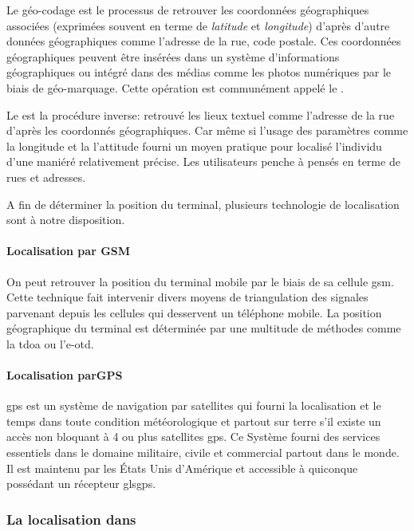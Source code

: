 Le géo-codage est le processus de retrouver les coordonnées
géographiques associées (exprimées souvent en terme de \textit{latitude}
et \textit{longitude}) d'après d'autre données géographiques comme
l'adresse de la rue, code postale. Ces coordonnées géographiques peuvent
être insérées dans un système d'informations géographiques ou intégré dans
des médias comme les photos numériques par le biais de géo-marquage.
Cette opération est communément appelé le .

Le  est la procédure inverse: retrouvé les lieux textuel comme l'adresse de la rue d'après les coordonnés géographiques. Car même si l'usage des paramètres comme la longitude et la l'attitude fourni un moyen pratique pour localisé l'individu d'une maniéré relativement précise. Les utilisateurs penche à pensés en terme de rues et adresses.

A fin de déterminer la position du terminal, plusieurs technologie de localisation sont à notre disposition.

\paragraph[Localisation par GSM]{Localisation par GSM}

On peut retrouver la position du terminal mobile par le biais de sa
cellule \gls{gsm}. Cette technique fait intervenir divers moyens de
triangulation des signales parvenant depuis les cellules qui desservent
un téléphone mobile. La position géographique du terminal est déterminée
par une multitude de méthodes comme la \gls{tdoa} ou l'\gls{e-otd}.

\paragraph[Localisation parGPS]{Localisation parGPS\cite{enig:gps}}

\gls{gps} est un système de navigation par satellites qui fourni la
localisation et le temps dans toute condition météorologique et partout
sur terre s'il existe un accès non bloquant à 4 ou plus satellites
\gls{gps}. Ce Système fourni des services essentiels dans le domaine
militaire, civile et commercial partout dans le monde. Il est maintenu
par les États Unis d'Amérique et accessible à quiconque possédant un
récepteur gls{gps}.

\subsubsection[La localisation dans \android{}]{La localisation dans \android{}\cite{pa4ad:chptr13}}\label{sss:android_localisation}

